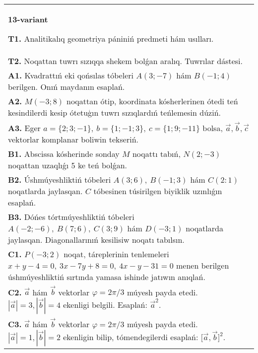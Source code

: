 \documentclass{article}
\begin{document}
\begin{tabular}{m{17cm}}
\textbf{13-variant}

\textbf{T1.} Analitikalıq geometriya pániniń predmeti hám usılları.
 \\
\textbf{T2.} 
Noqattan tuwrı sızıqqa shekem bolǵan aralıq. Tuwrılar dástesi.
 \\
\textbf{A1.} 
Kvadrattıń eki qońsılas tóbeleri $A (3; -7) $ hám
$B (-1;4) $ berilgen. Onıń maydanın esaplań.
 \\
\textbf{A2.} 
$M (-3;8) $ noqattan ótip, koordinata kósherlerinen ótedi
teń kesindilerdi kesip ótetuģın tuwrı sızıqlardıń teńlemesin dúziń.
 \\
\textbf{A3.} 
Eger \(a = \{ 2;3; - 1\}, \ b = \{ 1; - 1;3\}, \ c = \{ 1;9; - 11\}\) bolsa, $\overrightarrow{a}, \overrightarrow{b}, \overrightarrow{c}$ vektorlar komplanar boliwin tekseriń.
 \\
\textbf{B1.} 
Abscissa kósherinde sonday $M$ noqattı tabıń,
\(N (2;-3) \) noqattan uzaqlıǵı 5 ke teń bolǵan.
 \\
\textbf{B2.} 
Úshmúyeshliktiń tóbeleri \(A (3;6),\ B (-1;3) \) hám
\(C (2: 1) \) noqatlarda jaylasqan. $C$ tóbesinen túsirilgen biyiklik uzınlıǵın esaplań.
 \\
\textbf{B3.} 
Dóńes tórtmúyeshliktiń tóbeleri
\(A (-2;-6),\ B (7;6),\ C (3;9) \) hám \(D (-3;1) \) noqatlarda
jaylasqan. Diagonallarınıń kesilisiw noqatı tabılsın.
 \\
\textbf{C1.} 
\(P (−3;2) \) noqat, táreplerinin tenlemeleri
\(x+y-4=0,\ 3x-7y+8=0,\ 4x-y-31=0\) menen
berilgen úshmúyeshliktiń sırtında yamasa ishinde jatıwın anıqlań.
 \\
\textbf{C2.} 
$\vec{a}$ hám $\vec{b}$ vektorlar $\varphi = 2\pi/3$ múyesh payda etedi. $|\vec{a}| = 3,|\vec{b}| = 4$ ekenligi belgili. Esaplań:
${\vec{a}}^{2}$.
 \\
\textbf{C3.} 
$\vec{a}$ hám $\vec{b}$ vektorlar $\varphi = 2\pi/3$ múyesh payda etedi. $|\vec{a}| = 1,|\vec{b}| = 2$ ekenligin bilip, tómendegilerdi esaplań:
$\lbrack\vec{a},\vec{b}\rbrack^{2}$.
 \\

\end{tabular}
\vspace{1cm}
\end{document}
